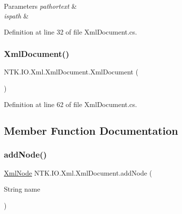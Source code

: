 \begin{DoxyParams}{Parameters}
{\em pathortext} & \\
\hline
{\em ispath} & \\
\hline
\end{DoxyParams}


Definition at line 32 of file Xml\+Document.\+cs.

\mbox{\label{class_n_t_k_1_1_i_o_1_1_xml_1_1_xml_document_ad371e7ef6ce5ddb1776a98c9b9d66dc1}} 
\subsubsection{\texorpdfstring{XmlDocument()}{XmlDocument()}\hspace{0.1cm}{\footnotesize\ttfamily [2/2]}}
{\footnotesize\ttfamily N\+T\+K.\+I\+O.\+Xml.\+Xml\+Document.\+Xml\+Document (\begin{DoxyParamCaption}{ }\end{DoxyParamCaption})}







Definition at line 62 of file Xml\+Document.\+cs.



\subsection{Member Function Documentation}
\mbox{\label{class_n_t_k_1_1_i_o_1_1_xml_1_1_xml_document_a24e804c34688d0171a15864a5d01d8e8}} 
\subsubsection{\texorpdfstring{addNode()}{addNode()}\hspace{0.1cm}{\footnotesize\ttfamily [1/3]}}
{\footnotesize\ttfamily \mbox{\hyperlink{class_n_t_k_1_1_i_o_1_1_xml_1_1_xml_node}{Xml\+Node}} N\+T\+K.\+I\+O.\+Xml.\+Xml\+Document.\+add\+Node (\begin{DoxyParamCaption}\item[{String}]{name }\end{DoxyParamCaption})}






